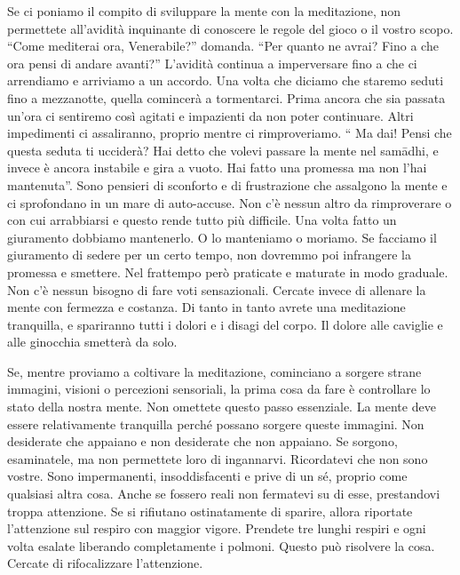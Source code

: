 Se ci poniamo il compito di sviluppare la mente con la meditazione, non
permettete all'avidità inquinante di conoscere le regole del gioco o il
vostro scopo. ``Come mediterai ora, Venerabile?'' domanda. ``Per quanto
ne avrai? Fino a che ora pensi di andare avanti?'' L'avidità continua a
imperversare fino a che ci arrendiamo e arriviamo a un accordo. Una
volta che diciamo che staremo seduti fino a mezzanotte, quella comincerà
a tormentarci. Prima ancora che sia passata un'ora ci sentiremo così
agitati e impazienti da non poter continuare. Altri impedimenti ci
assaliranno, proprio mentre ci rimproveriamo. `` Ma dai! Pensi che
questa seduta ti ucciderà? Hai detto che volevi passare la mente nel
samādhi, e invece è ancora instabile e gira a vuoto. Hai fatto una
promessa ma non l'hai mantenuta''. Sono pensieri di sconforto e di
frustrazione che assalgono la mente e ci sprofondano in un mare di
auto-accuse. Non c'è nessun altro da rimproverare o con cui arrabbiarsi
e questo rende tutto più difficile. Una volta fatto un giuramento
dobbiamo mantenerlo. O lo manteniamo o moriamo. Se facciamo il
giuramento di sedere per un certo tempo, non dovremmo poi infrangere la
promessa e smettere. Nel frattempo però praticate e maturate in modo
graduale. Non c'è nessun bisogno di fare voti sensazionali. Cercate
invece di allenare la mente con fermezza e costanza. Di tanto in tanto
avrete una meditazione tranquilla, e spariranno tutti i dolori e i
disagi del corpo. Il dolore alle caviglie e alle ginocchia smetterà da
solo.

Se, mentre proviamo a coltivare la meditazione, cominciano a sorgere
strane immagini, visioni o percezioni sensoriali, la prima cosa da fare
è controllare lo stato della nostra mente. Non omettete questo passo
essenziale. La mente deve essere relativamente tranquilla perché possano
sorgere queste immagini. Non desiderate che appaiano e non desiderate
che non appaiano. Se sorgono, esaminatele, ma non permettete loro di
ingannarvi. Ricordatevi che non sono vostre. Sono impermanenti,
insoddisfacenti e prive di un sé, proprio come qualsiasi altra cosa.
Anche se fossero reali non fermatevi su di esse, prestandovi troppa
attenzione. Se si rifiutano ostinatamente di sparire, allora riportate
l'attenzione sul respiro con maggior vigore. Prendete tre lunghi respiri
e ogni volta esalate liberando completamente i polmoni. Questo può
risolvere la cosa. Cercate di rifocalizzare l'attenzione.

